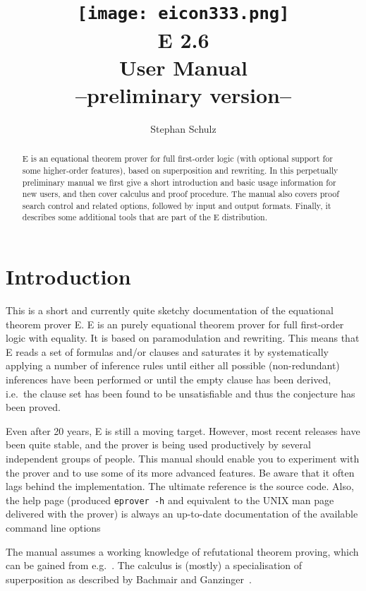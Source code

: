 \documentclass{report}
\author{Stephan Schulz}
\title{\texttt{[image: eicon333.png]}\\[5ex]E 2.6\\[1.5ex]User Manual\\[1.5ex]{\normalsize --preliminary
    version--}}
\begin{document}
\maketitle{}

\begin{abstract}
  E is an equational theorem prover for full first-order logic (with
  optional support for some higher-order features), based on
  superposition and rewriting. In this perpetually preliminary manual
  we first give a short introduction and basic usage information for
  new users, and then cover calculus and proof procedure. The manual
  also covers proof search control and related options, followed by
  input and output formats. Finally, it describes some additional
  tools that are part of the E distribution.
\end{abstract}

\tableofcontents{}

\chapter{Introduction}
\label{sec:intro}

This is a short and currently quite sketchy documentation of the
equational theorem prover E. E is an purely equational theorem prover
for full first-order logic with equality. It is based on
paramodulation and rewriting. This means that E reads a set of
formulas and/or clauses and saturates it by systematically applying a
number of inference rules until either all possible (non-redundant)
inferences have been performed or until the empty clause has been
derived, i.e.\ the clause set has been found to be unsatisfiable and
thus the conjecture has been proved.

Even after 20 years, E is still a moving target. However, most recent
releases have been quite stable, and the prover is being used
productively by several independent groups of people. This manual
should enable you to experiment with the prover and to use some of its
more advanced features. Be aware that it often lags behind the
implementation. The ultimate reference is the source code. Also, the
help page (produced \texttt{eprover -h} and equivalent to the UNIX man
page delivered with the prover) is always an up-to-date documentation
of the available command line options

The manual assumes a working knowledge of refutational theorem
proving, which can be gained from e.g.~\cite{CL73}. The calculus is
(mostly) a specialisation of superposition as described by Bachmair
and Ganzinger~\cite{BG94}.
\end{document}
